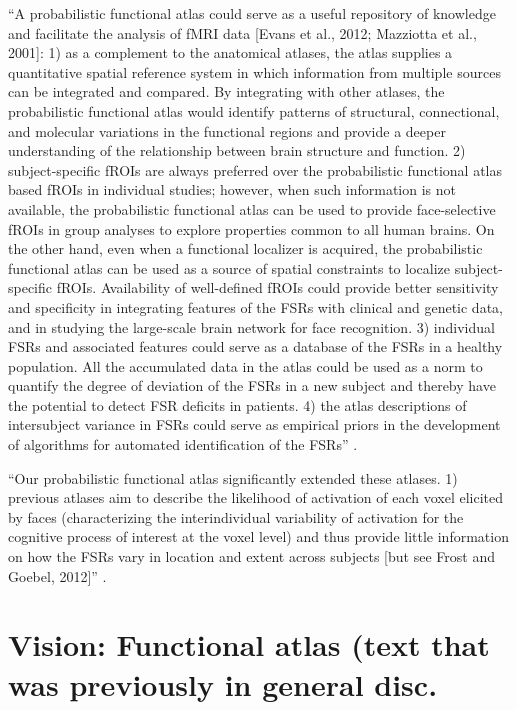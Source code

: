``A probabilistic functional atlas could serve as a useful repository of
knowledge and facilitate the analysis of fMRI data [Evans et al., 2012;
Mazziotta et al., 2001]:
%
1) as a complement to the anatomical atlases, the atlas supplies a quantitative
spatial reference system in which information from multiple sources can be
integrated and compared.
%
By integrating with other atlases, the probabilistic functional atlas would
identify patterns of structural, connectional, and molecular variations in the
functional regions and provide a deeper understanding of the relationship
between brain structure and function.
%
2) subject-specific fROIs are always preferred over the probabilistic functional
atlas based fROIs in individual studies;
%
however, when such information is not available, the probabilistic functional
atlas can be used to provide face-selective fROIs in group analyses to explore
properties common to all human brains.
%
On the other hand, even when a functional localizer is acquired, the
probabilistic functional atlas can be used as a source of spatial constraints to
localize subject-specific fROIs.
%
Availability of well-defined fROIs could provide better sensitivity and
specificity in integrating features of the FSRs with clinical and genetic data,
and in studying the large-scale brain network for face recognition.
%
3) individual FSRs and associated features could serve as a
database of the FSRs in a healthy population.
%
All the accumulated data in the atlas could be used as a norm to quantify the
degree of deviation of the FSRs in a new subject and thereby have the potential
to detect FSR deficits in patients.
%
4) the atlas descriptions of intersubject variance in FSRs could serve as
empirical priors in the development of algorithms for automated identification
of the FSRs'' \citep{zhen2015quantifying}.

``Our probabilistic functional atlas significantly extended these atlases.
%
1) previous atlases aim to describe the likelihood of activation of each voxel
elicited by faces (characterizing the interindividual variability of activation
for the cognitive process of interest at the voxel level) and thus provide
little information on how the FSRs vary in location and extent across subjects
[but see Frost and Goebel, 2012]'' \citep{zhen2015quantifying}.


\section{Vision: Functional atlas (text that was previously in general disc.}

